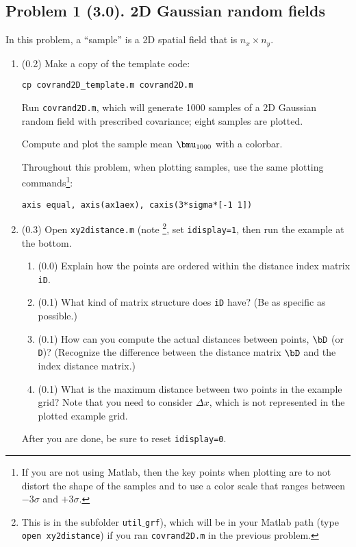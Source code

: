 \documentclass[11pt,titlepage,fleqn]{article}
\begin{document}

\pagebreak
\subsection*{Problem 1 (3.0). 2D Gaussian random fields}

In this problem, a ``sample'' is a 2D spatial field that is $n_x \times n_y$.
%
\begin{enumerate}
\item (0.2) Make a copy of the template code:
%
\begin{verbatim}
cp covrand2D_template.m covrand2D.m
\end{verbatim}
%
Run \verb+covrand2D.m+, which will generate 1000 samples of a 2D Gaussian random field with prescribed covariance; eight samples are plotted.

Compute and plot the sample mean $\bmu_{1000}$ with a colorbar.

Throughout this problem, when plotting samples, use the same plotting commands\footnote{If you are not using Matlab, then the key points when plotting are to not distort the shape of the samples and to use a color scale that ranges between $-3\sigma$ and $+3\sigma$.}:

\verb+axis equal, axis(ax1aex), caxis(3*sigma*[-1 1])+

\item (0.3) Open \verb+xy2distance.m+ (note \footnote{This is in the subfolder {\tt util$\_$grf}), which will be in your Matlab path (type {\tt open xy2distance}) if you ran {\tt covrand2D.m} in the previous problem.}, set \verb+idisplay=1+, then run the example at the bottom.
%
\begin{enumerate}
\item (0.0) Explain how the points are ordered within the distance index matrix \verb+iD+.
\item (0.1) What kind of matrix structure does \verb+iD+ have? (Be as specific as possible.)
\item (0.1) How can you compute the actual distances between points, $\bD$ (or \verb+D+)? 
(Recognize the difference between the distance matrix $\bD$ and the index distance matrix.)
\item (0.1) What is the maximum distance between two points in the example grid?
Note that you need to consider $\Delta x$, which is not represented in the plotted example grid.
\end{enumerate}
%
After you are done, be sure to reset \verb+idisplay=0+.


\end{enumerate}
\end{document}

